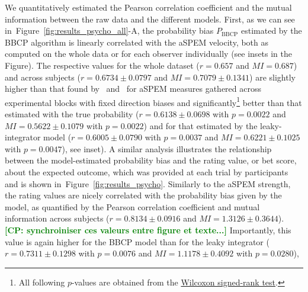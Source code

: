 \documentclass[12pt,english]{article}%
\newcommand{\Cc}{\mathcal{C}}
\newcommand{\citet}[1]{\textcite{#1}}
\newcommand{\seeFig}[1]{Figure~\ref{fig:#1}}
\newcommand{\seeEq}[1]{Equation~\ref{eq:#1}}
\newcommand{\seeApp}[1]{Appendix~\ref{app:#1}}
\newcommand{\CP}[1]{\textbf{\textcolor{green}{[CP: #1]}}}
\begin{document}
We quantitatively estimated the Pearson correlation coefficient
and the mutual information %
between the raw data and the different models.
First, as we can see in~\seeFig{results_psycho_all}-A,
the probability bias $P_{\text{BBCP}}$ estimated by the BBCP algorithm
is linearly correlated with the aSPEM velocity, both as computed on the whole data or 
for each observer individually (see insets in the Figure).
The respective values %
for the whole dataset
($r = 0.657$ and $MI = 0.687$) %
and across subjects
($r = 0.6734 \pm 0.0797 $ and $MI =  0.7079 \pm 0.1341$) %
are slightly higher than that found by~\citet{Montagnini2010} and~\citet{Damasse18} 
for aSPEM measures gathered across experimental blocks with fixed direction biases %
and significantly\footnote{All following $p$-values are obtained from the \href{https://docs.scipy.org/doc/scipy/reference/generated/scipy.stats.wilcoxon.html}{Wilcoxon signed-rank test}.} better than that estimated 
with the true probability 
($r = 0.6138 \pm 0.0698 $ with $p=0.0022$ and $MI = 0.5622 \pm 0.1079$ with $p=0.0022$) %
and for that estimated by the leaky-integrator model 
($r = 0.6005 \pm 0.0790$ with $p=0.0037$ and $MI =  0.6221 \pm 0.1025$ with $p=0.0047$), see inset).
A similar analysis
illustrates the relationship between
the model-estimated probability bias
and the rating value, or bet score, about the expected outcome, which was provided at each trial
by participants 
and is shown in~\seeFig{results_psycho}.
Similarly to the aSPEM strength, the rating values are nicely correlated
with the probability bias given by the model, 
as quantified by the Pearson correlation coefficient and mutual information 
across subjects ($r = 0.8134 \pm 0.0916 $ and $MI = 1.3126 \pm 0.3644$).
\CP{synchroiniser ces valeurs entre figure et texte...}
Importantly, this value is again higher for the BBCP model than
for the leaky integrator ($r = 0.7311 \pm 0.1298 $ with $p=0.0076$ and $MI =  1.1178 \pm 0.4092$ with $p=0.0280$),
\end{document}
